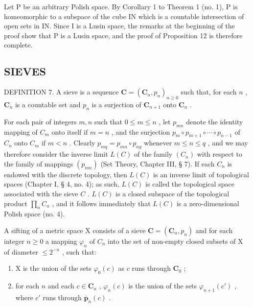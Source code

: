 Let P be an arbitrary Polish space. By Corollary 1 to Theorem 1 (no. 1), P is homeomorphic to a subspace of the cube IN which is a countable intersection of open sets in IN. Since I is a Lusin space, the remarks at the beginning of the proof show that P is a Lusin space, and the proof of Proposition 12 is therefore complete.

\subsection{SIEVES}

DEFINITION 7. A sieve is a sequence \(\mathbf{C} = (\mathbf{C}_n, p_n)_{n \geqslant 0}\) such that, for each \(n\) , \(\mathbf{C}_n\) is a countable set and \(p_n\) is a surjection of \(\mathbf{C}_{n+1}\) onto \(\mathbf{C}_n\) .

For each pair of integers \(m, n\) such that \(0 \leqslant m \leqslant n\) , let \(p_{mn}\) denote the identity mapping of \(C_m\) onto itself if \(m = n\) , and the surjection \(p_m \circ p_{m+1} \circ \cdots \circ p_{n-1}\) of \(C_n\) onto \(C_m\) if \(m < n\) . Clearly \(p_{mq} = p_{mn} \circ p_{ng}\) whenever \(m \leqslant n \leqslant q\) , and we may therefore consider the inverse limit \(L(C)\) of the family \((C_n)\) with respect to the family of mappings \((p_{mn})\) (Set Theory, Chapter III, § 7). If each \(C_n\) is endowed with the discrete topology, then \(L(C)\) is an inverse limit of topological spaces (Chapter I, § 4, no. 4); as such, \(L(C)\) is called the topological space associated with the sieve \(C\) . \(L(C)\) is a closed subspace of the topological product \(\prod_n C_n\) , and it follows immediately that \(L(C)\) is a zero-dimensional Polish space (no. 4).

A sifting of a metric space X consists of a sieve \(\mathbf{C} = (\mathbf{C}_{n}, p_{n})\) and for each integer \(n \geqslant 0\) a mapping \(\varphi_{n}\) of \(C_{n}\) into the set of non-empty closed subsets of X of diameter \(\leqslant 2^{-n}\) , such that:

\begin{enumerate}
\def\labelenumi{\alph{enumi})}
\item
  X is the union of the sets \(\varphi_0(c)\) as \(c\) runs through \(\mathbf{C}_0\) ;
\item
  for each \(n\) and each \(c \in \mathbf{C}_n\) , \(\varphi_n(c)\) is the union of the sets \(\varphi_{n+1}(c')\) , where \(c'\) runs through \(\overline{\pmb{p}}_n(c)\) .
\end{enumerate}

